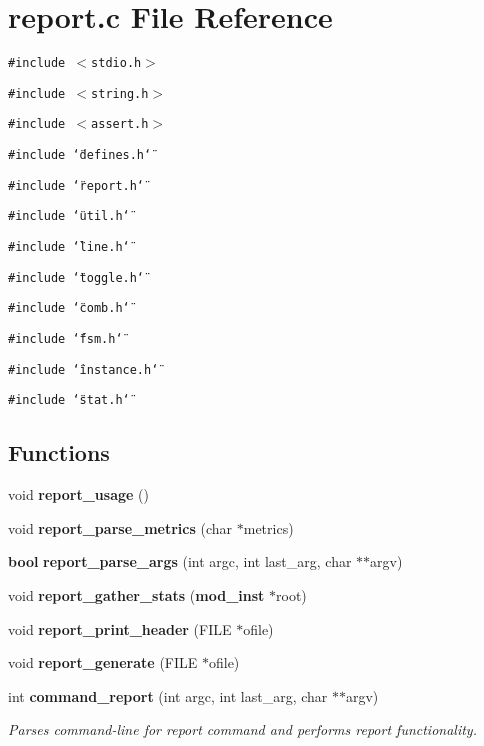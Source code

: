 \section{report.c File Reference}
\label{report_8c}
{\tt \#include $<$stdio.h$>$}\par
{\tt \#include $<$string.h$>$}\par
{\tt \#include $<$assert.h$>$}\par
{\tt \#include \char`\"{}defines.h\char`\"{}}\par
{\tt \#include \char`\"{}report.h\char`\"{}}\par
{\tt \#include \char`\"{}util.h\char`\"{}}\par
{\tt \#include \char`\"{}line.h\char`\"{}}\par
{\tt \#include \char`\"{}toggle.h\char`\"{}}\par
{\tt \#include \char`\"{}comb.h\char`\"{}}\par
{\tt \#include \char`\"{}fsm.h\char`\"{}}\par
{\tt \#include \char`\"{}instance.h\char`\"{}}\par
{\tt \#include \char`\"{}stat.h\char`\"{}}\par
\subsection*{Functions}
\begin{CompactItemize}
\item 
void {\bf report\_\-usage} ()
\item 
void {\bf report\_\-parse\_\-metrics} (char $\ast$metrics)
\item 
{\bf bool} {\bf report\_\-parse\_\-args} (int argc, int last\_\-arg, char $\ast$$\ast$argv)
\item 
void {\bf report\_\-gather\_\-stats} ({\bf mod\_\-inst} $\ast$root)
\item 
void {\bf report\_\-print\_\-header} (FILE $\ast$ofile)
\item 
void {\bf report\_\-generate} (FILE $\ast$ofile)
\item 
int {\bf command\_\-report} (int argc, int last\_\-arg, char $\ast$$\ast$argv)
\begin{CompactList}\small\item\em Parses command-line for report command and performs report functionality.\item\end{CompactList}\end{CompactItemize}
